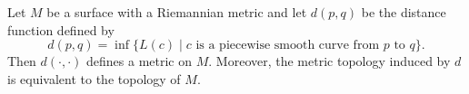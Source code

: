 Let $M$ be a surface with a Riemannian metric and let $d(p,q)$ be the distance function defined by
$$d(p,q) = \inf\{L(c) \mid c \text{ is a piecewise smooth curve from } p \text{ to } q\}.$$
Then $d(\cdot,\cdot)$ defines a metric on $M$. Moreover, the metric topology induced by $d$ is equivalent to the topology of $M$.
